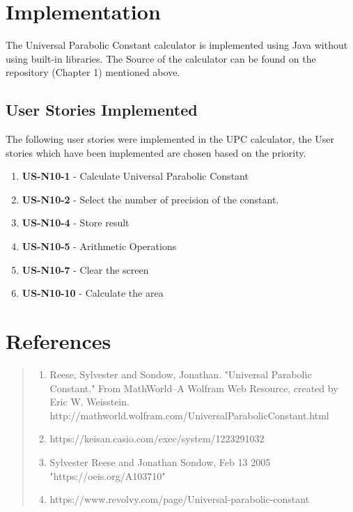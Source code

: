 \documentclass[12pt]{report}
\begin{document}
\chapter{Implementation}

The Universal Parabolic Constant calculator is implemented using Java without using built-in libraries. The Source of the calculator can be found on the repository (Chapter 1) mentioned above.

\section{User Stories Implemented}

The following user stories were implemented in the UPC calculator, the User stories which have been implemented are chosen based on the priority.

\begin{enumerate}
    \item\textbf{ US-N10-1} - Calculate Universal Parabolic Constant
    \item \textbf{US-N10-2} - Select the number of precision of the constant.
    \item \textbf{US-N10-4} - Store result
    \item \textbf{US-N10-5} - Arithmetic Operations
    \item \textbf{US-N10-7} - Clear the screen
    \item \textbf{US-N10-10} - Calculate the area
\end{enumerate}




\chapter{References}
\begin{quote}
    

\begin{enumerate}
\item Reese, Sylvester and Sondow, Jonathan. "Universal Parabolic Constant." From MathWorld--A Wolfram Web Resource, created by Eric W. Weisstein. http://mathworld.wolfram.com/UniversalParabolicConstant.html
\item https://keisan.casio.com/exec/system/1223291032
\item Sylvester Reese and Jonathan Sondow, Feb 13 2005 "https://oeis.org/A103710"
\item https://www.revolvy.com/page/Universal-parabolic-constant

\end{enumerate}


\end{quote}
\end{document}
